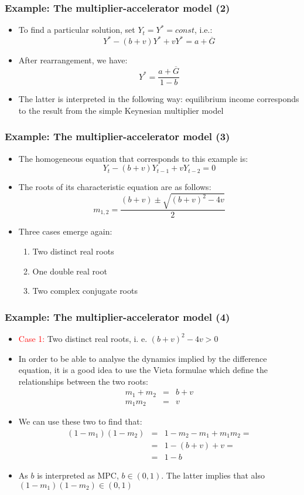 \documentclass[10pt,usenames,dvipsnames]{beamer}
\theoremstyle{definition}
\begin{document}
\begin{frame}[fragile]
\frametitle{Example: The multiplier-accelerator model (2)}
\begin{itemize}
	\item To find a particular solution, set $Y_{t} = Y^{*} = const$, i.e.:
	\[
		Y^{*} - (b + v)Y^{*} + vY^{*} = a + \overline{G}
	\]
	\item After rearrangement, we have:
	\[
		Y^{*} = \frac{a + \overline{G}}{1-b}
	\]
	\item The latter is interpreted in the following way: equilibrium income corresponds to the result from the simple Keynesian multiplier model
\end{itemize}
\end{frame}

\begin{frame}[fragile]
\frametitle{Example: The multiplier-accelerator model (3)}
\begin{itemize}
	\item The homogeneous equation that corresponds to this example is:
	\[
		Y_{t} - (b + v)Y_{t-1} + vY_{t-2} = 0
	\]
	\item The roots of its characteristic equation are as follows:
	\[
		m_{1,2} = \frac{(b+v) \pm \sqrt{(b+v)^{2} - 4v}}{2}
	\]
	\item Three cases emerge again:
	\begin{enumerate}
		\item Two distinct real roots
		\item One double real root
		\item Two complex conjugate roots
	\end{enumerate}
\end{itemize}
\end{frame}

\begin{frame}[fragile]
\frametitle{Example: The multiplier-accelerator model (4)}
\begin{itemize}
	\item \textcolor{red}{Case 1:} Two distinct real roots, i. e. $(b+v)^{2} - 4v > 0$ 
	\item In order to be able to analyse the dynamics implied by the difference equation, it is a good idea to use the Vieta formulae which define the relationships between the two roots:
	\[
		\begin{array}{lcl}
			m_{1} + m_{2} & = & b + v\\
			m_{1}m_{2} & = & v
		\end{array}
	\]
	\item We can use these two to find that:
	\[
	\begin{array}{lcl}
		(1 - m_{1})(1 - m_{2}) & = & 1 - m_{2} - m_{1} + m_{1}m_{2} = \\
		& = & 1 - (b + v) + v = \\
		& = & 1 - b
	\end{array}
	\]
	\item As $b$ is interpreted as MPC, $b \in (0,1)$. The latter implies that also $(1 - m_{1})(1 - m_{2}) \in (0,1)$
\end{itemize}
\end{frame}
\end{document}
